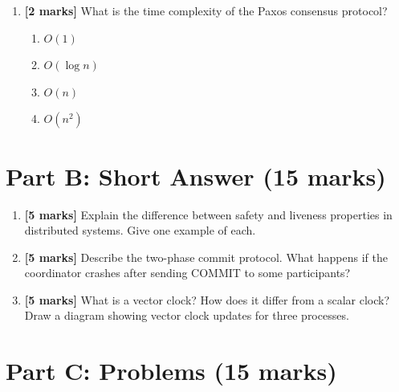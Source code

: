 \documentclass[
    language=english,
    doctype=quiz,
    institution=none,
]{../../omnilatex}
\begin{document}
\begin{enumerate}
    \item \textbf{[2 marks]} What is the time complexity of the Paxos
      consensus protocol?
    \begin{enumerate}[label=\Alph*.]
        \item $O(1)$
        \item $O(\log n)$
        \item $O(n)$
        \item $O(n^2)$
    \end{enumerate}
\end{enumerate}

\section*{Part B: Short Answer (15 marks)}

\begin{enumerate}
    \item \textbf{[5 marks]} Explain the difference between safety and
      liveness properties in distributed systems. Give one example of each.

    \item \textbf{[5 marks]} Describe the two-phase commit protocol.
      What happens if the coordinator crashes after sending COMMIT to
      some participants?

    \item \textbf{[5 marks]} What is a vector clock? How does it differ
      from a scalar clock? Draw a diagram showing vector clock updates
      for three processes.
\end{enumerate}

\section*{Part C: Problems (15 marks)}
\end{document}
